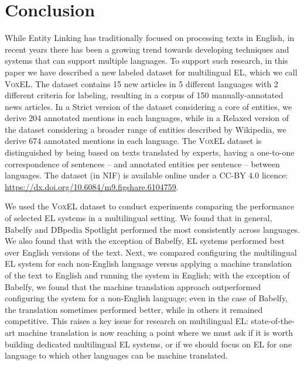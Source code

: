 \documentclass{llncs}
\begin{document}
\section{Conclusion}
\label{sec:conclusion}

While Entity Linking has traditionally focused on processing texts in English, in recent years there has been a growing trend towards developing techniques and systems that can support multiple languages. To support such research, in this paper we have described a new labeled dataset for multilingual EL, which we call \textsc{VoxEL}. The dataset contains 15 new articles in 5 different languages with 2 different criteria for labeling, resulting in a corpus of 150 manually-annotated news articles. In a Strict version of the dataset considering a core of entities, we derive 204 annotated mentions in each languages, while in a Relaxed version of the dataset considering a broader range of entities described by Wikipedia, we derive 674 annotated mentions in each language. The \textsc{VoxEL} dataset is distinguished by being based on texts translated by experts, having a one-to-one correspondence of sentences -- and annotated entities per sentence -- between languages. The dataset (in NIF) is available online under a CC-BY 4.0 licence: \url{https://dx.doi.org/10.6084/m9.figshare.6104759}.

We used the \textsc{VoxEL} dataset to conduct experiments comparing the performance of selected EL systems in a multilingual setting. We found that in general, Babelfy and DBpedia Spotlight performed the most consistently across languages. We also found that with the exception of Babelfy, EL systems performed best over English versions of the text. Next, we compared configuring the multilingual EL system for each non-English language versus applying a machine translation of the text to English and running the system in English; with the exception of Babelfy, we found that the machine translation approach outperformed configuring the system for a non-English language; even in the case of Babelfy, the translation sometimes performed better, while in others it remained competitive. This raises a key issue for research on multilingual EL: state-of-the-art machine translation is now reaching a point where we must ask if it is worth building dedicated multilingual EL systems, or if we should focus on EL for one language to which other languages can be machine translated. 


\end{document}
